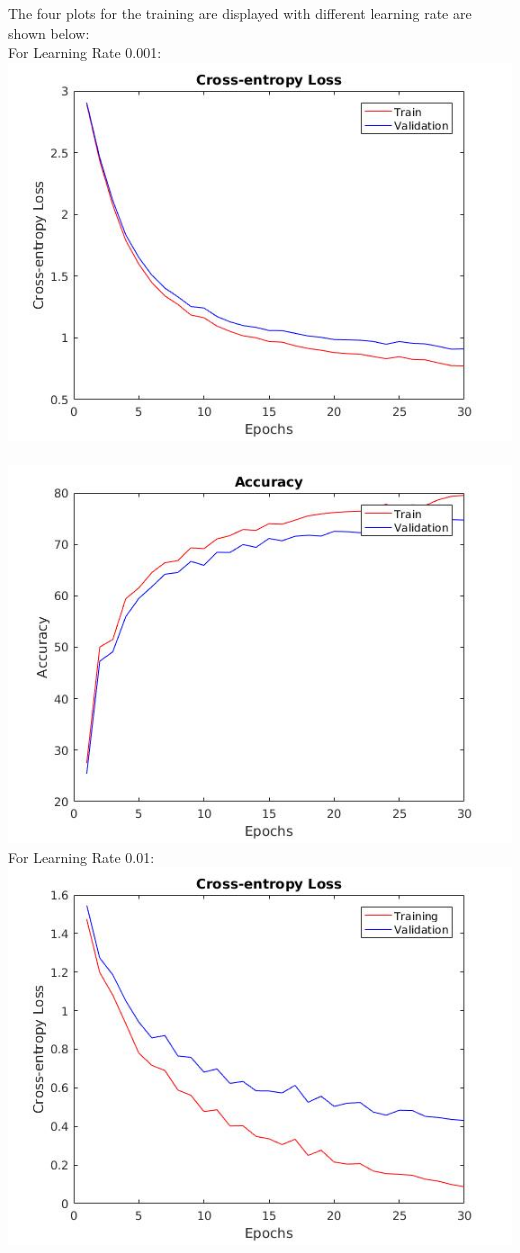 \documentclass[12pt]{article}
\newenvironment{problem}[2][Problem]{\begin{trivlist}
\item[\hskip \labelsep {\bfseries #1}\hskip \labelsep {\bfseries #2.}]}{\end{trivlist}}
\begin{document}
\begin{problem}{3.1.2}
The four plots for the training are displayed with different learning rate are shown below:\\
For Learning Rate 0.001:\\
\includegraphics[scale=0.4]{images/learning_acc_0_001.jpg} \ \includegraphics[scale=0.4]{images/learning_cross_0_001.jpg} \\
For Learning Rate 0.01:\\
\includegraphics[scale=0.4]{images/learning_cross_0_01.jpg}\

\end{problem}
\end{document}
